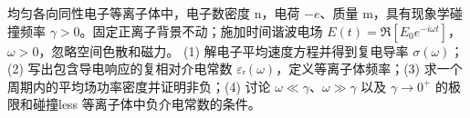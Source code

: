 均匀各向同性电子等离子体中，电子数密度 n，电荷 \(-e\)、质量 m，具有现象学碰撞频率 \(\gamma >0\)。固定正离子背景不动；施加时间谐波电场 \(E(t)=\Re[E_0e^{-i\omega t}]\)，\(\omega >0\)，忽略空间色散和磁力。
(1) 解电子平均速度方程并得到复电导率 \(\sigma (\omega )\)；(2) 写出包含导电响应的复相对介电常数 \(\varepsilon \)ᵣ\((\omega )\)，定义等离子体频率；(3) 求一个周期内的平均场功率密度并证明非负；(4) 讨论 \(\omega \ll \gamma \)、\(\omega \gg \gamma \) 以及 \(\gamma \to 0^{+}\) 的极限和碰撞less 等离子体中负介电常数的条件。
